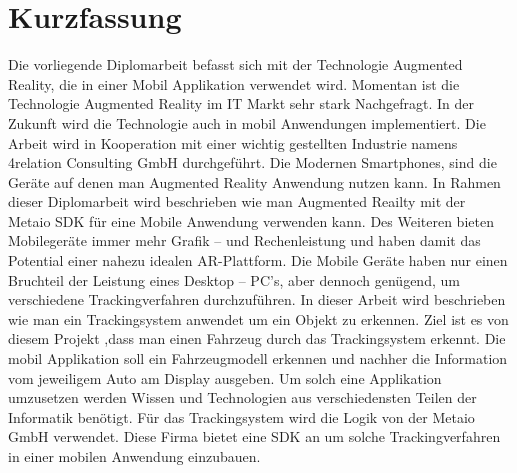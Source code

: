 \chapter*{Kurzfassung}

Die vorliegende Diplomarbeit befasst sich mit der Technologie Augmented Reality, die in einer Mobil Applikation verwendet wird. Momentan ist die Technologie Augmented Reality im IT Markt sehr stark Nachgefragt. In der Zukunft wird die Technologie auch in mobil Anwendungen implementiert. Die Arbeit wird in Kooperation mit einer wichtig gestellten Industrie namens 4relation Consulting GmbH durchgef{\"u}hrt. Die Modernen Smartphones,  sind die Ger{\"a}te  auf denen man Augmented Reality Anwendung nutzen kann. In Rahmen dieser Diplomarbeit wird beschrieben wie man Augmented Reailty mit der Metaio SDK f{\"u}r eine Mobile Anwendung verwenden kann. Des Weiteren bieten Mobileger{\"a}te  immer mehr Grafik -- und Rechenleistung und haben damit das Potential einer nahezu idealen AR-Plattform. Die Mobile Ger{\"a}te haben nur einen Bruchteil der Leistung eines Desktop -- PC's, aber dennoch gen{\"u}gend, um verschiedene Trackingverfahren durchzuf{\"u}hren. In dieser Arbeit wird beschrieben wie man ein Trackingsystem anwendet um ein Objekt zu erkennen. Ziel ist es von diesem Projekt ,dass man einen Fahrzeug durch das Trackingsystem erkennt. Die mobil Applikation soll ein Fahrzeugmodell erkennen und nachher die Information vom jeweiligem Auto am Display ausgeben. Um solch eine Applikation umzusetzen werden Wissen und Technologien aus verschiedensten Teilen der Informatik ben{\"o}tigt. F{\"u}r das Trackingsystem wird die Logik von der Metaio GmbH verwendet. Diese Firma bietet eine SDK an um solche Trackingverfahren in einer mobilen Anwendung einzubauen.

         